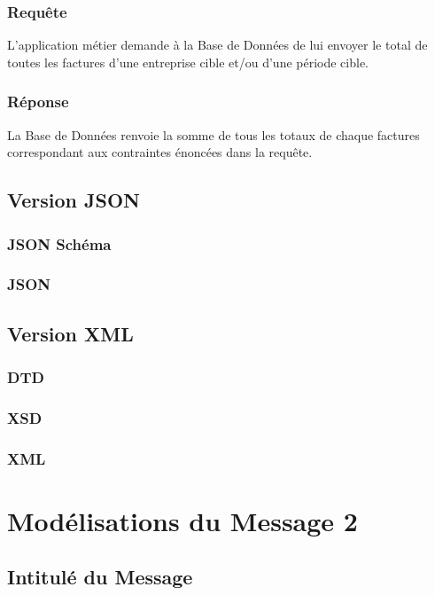 \documentclass[a4paper, 11pt]{article}
\begin{document}
        \subsubsection{Requête} 
        L'application métier demande à la Base de Données de lui envoyer le total de toutes les factures d'une entreprise cible et/ou d'une période cible.
        \subsubsection{Réponse}
        La Base de Données renvoie la somme de tous les totaux de chaque factures correspondant aux contraintes énoncées dans la requête.
    \subsection{Version JSON}
        \subsubsection{JSON Schéma}
        
        \subsubsection{JSON}

    \subsection{Version XML}
        \subsubsection{DTD}
        
        \subsubsection{XSD}
        
        \subsubsection{XML}

\section{Modélisations du Message 2}
    \subsection{Intitulé du Message}
\end{document}
